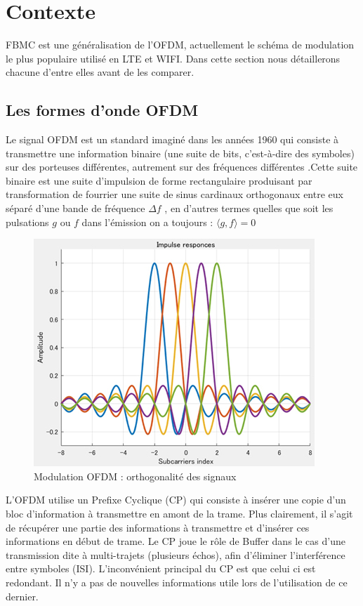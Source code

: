 \documentclass[conference]{IEEEtran}
\begin{document}
\section{Contexte}

FBMC est une généralisation de l'OFDM, actuellement le schéma de modulation le plus populaire utilisé en LTE et WIFI. Dans cette section nous détaillerons chacune d'entre elles avant de les comparer.

\subsection{Les formes d'onde OFDM}
Le signal OFDM est un standard imaginé dans les années 1960 qui consiste à transmettre une information binaire (une suite de bits, c’est-à-dire des symboles) sur des porteuses différentes, autrement sur des fréquences différentes \cite{b3}.Cette suite binaire est une suite d'impulsion de forme rectangulaire produisant par transformation de fourrier une suite de sinus cardinaux orthogonaux entre eux séparé d'une bande de fréquence $\Delta f$ , en d'autres termes quelles que soit les pulsations $g$ ou $f$ dans l'émission on a toujours : $\langle g,f \rangle = 0$

\begin{figure}[htbp]
\centerline{\includegraphics{OFDM_ortho.jpg}}
\caption{Modulation OFDM : orthogonalité des signaux}
\label{OFDM_ortho}
\end{figure}

L'OFDM utilise un Prefixe Cyclique (CP) qui consiste à insérer une copie d’un bloc d’information à transmettre en amont de la trame. Plus clairement, il s’agit de récupérer une partie des informations à transmettre et d’insérer ces informations en début de trame. Le CP joue le rôle de Buffer dans le cas d’une transmission dite à  multi-trajets (plusieurs échos), afin d’éliminer l’interférence entre symboles (ISI).
L'inconvénient principal du CP est que celui ci est redondant. Il n'y a pas de nouvelles informations utile lors de l'utilisation de ce dernier.
\end{document}
